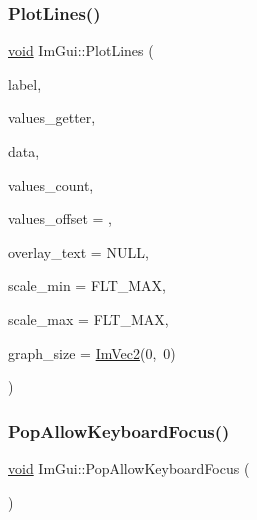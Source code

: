 \subsubsection{\texorpdfstring{Plot\+Lines()}{PlotLines()}\hspace{0.1cm}{\footnotesize\ttfamily [2/2]}}
{\footnotesize\ttfamily \hyperlink{imgui__impl__opengl3__loader_8h_ac668e7cffd9e2e9cfee428b9b2f34fa7}{void} Im\+Gui\+::\+Plot\+Lines (\begin{DoxyParamCaption}\item[{const char $\ast$}]{label,  }\item[{float($\ast$)(\hyperlink{imgui__impl__opengl3__loader_8h_ac668e7cffd9e2e9cfee428b9b2f34fa7}{void} $\ast$\hyperlink{imgui__impl__opengl3__loader_8h_abd87654504355b4c1bb002dcb1d4d16a}{data}, int idx)}]{values\+\_\+getter,  }\item[{\hyperlink{imgui__impl__opengl3__loader_8h_ac668e7cffd9e2e9cfee428b9b2f34fa7}{void} $\ast$}]{data,  }\item[{int}]{values\+\_\+count,  }\item[{int}]{values\+\_\+offset = {},  }\item[{const char $\ast$}]{overlay\+\_\+text = {\ttfamily NULL},  }\item[{float}]{scale\+\_\+min = {\ttfamily FLT\+\_\+MAX},  }\item[{float}]{scale\+\_\+max = {\ttfamily FLT\+\_\+MAX},  }\item[{\hyperlink{structImVec2}{Im\+Vec2}}]{graph\+\_\+size = {\ttfamily \hyperlink{structImVec2}{Im\+Vec2}(0,~0)} }\end{DoxyParamCaption})}

\mbox{\label{namespaceImGui_a017db69016de97685aec978e504dc96d}} 
\subsubsection{\texorpdfstring{Pop\+Allow\+Keyboard\+Focus()}{PopAllowKeyboardFocus()}}
{\footnotesize\ttfamily \hyperlink{imgui__impl__opengl3__loader_8h_ac668e7cffd9e2e9cfee428b9b2f34fa7}{void} Im\+Gui\+::\+Pop\+Allow\+Keyboard\+Focus (\begin{DoxyParamCaption}{ }\end{DoxyParamCaption})}

\mbox{\label{namespaceImGui_a0f883e8507be797ca8ba1448d2b9dbb0}} 
